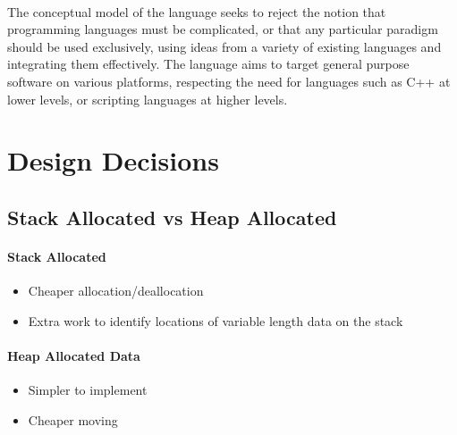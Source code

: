 \documentclass{article}
\begin{document}
\paragraph{}
The conceptual model of the language seeks to reject the notion that programming languages must be complicated, or that any particular paradigm should be used exclusively, using ideas from a variety of existing languages and integrating them effectively. The language aims to target general purpose software on various platforms, respecting the need for languages such as C++ at lower levels, or scripting languages at higher levels.

\section{Design Decisions}

\subsection{Stack Allocated vs Heap Allocated}

\paragraph{Stack Allocated}
\begin{itemize}
\item Cheaper allocation/deallocation
\item Extra work to identify locations of variable length data on the stack
\end{itemize}

\paragraph{Heap Allocated Data}
\begin{itemize}
\item Simpler to implement
\item Cheaper moving
\end{itemize}
\end{document}
